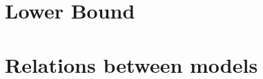 

\section{Lower Bound}\label{section-prob-lower-bound}



\section{Relations between models}\label{relations}

